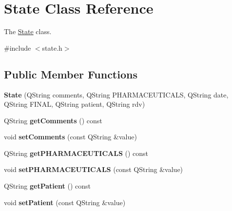 \hypertarget{class_state}{}\section{State Class Reference}
\label{class_state}


The \mbox{\hyperlink{class_state}{State}} class.  




{\ttfamily \#include $<$state.\+h$>$}

\subsection*{Public Member Functions}
\begin{DoxyCompactItemize}
\item 
\mbox{\label{class_state_a8ded2cb128d0c4d3dde1fedb066e964a}} 
{\bfseries State} (Q\+String comments, Q\+String P\+H\+A\+R\+M\+A\+C\+E\+U\+T\+I\+C\+A\+LS, Q\+String date, Q\+String F\+I\+N\+AL, Q\+String patient, Q\+String rdv)
\item 
\mbox{\label{class_state_ad92b83c6f4907e456cdfc5b51fa8fdd1}} 
Q\+String {\bfseries get\+Comments} () const
\item 
\mbox{\label{class_state_ac23a5b33d51e2e2798ab5ec94f54d379}} 
void {\bfseries set\+Comments} (const Q\+String \&value)
\item 
\mbox{\label{class_state_a2b63ae87a83465d6f8fae8c2ad109c15}} 
Q\+String {\bfseries get\+P\+H\+A\+R\+M\+A\+C\+E\+U\+T\+I\+C\+A\+LS} () const
\item 
\mbox{\label{class_state_aa494c330e398a6477699b7a3890a6d4f}} 
void {\bfseries set\+P\+H\+A\+R\+M\+A\+C\+E\+U\+T\+I\+C\+A\+LS} (const Q\+String \&value)
\item 
\mbox{\label{class_state_a7743f5db2b54ebf32d8a319b665bccda}} 
Q\+String {\bfseries get\+Patient} () const
\item 
\mbox{\label{class_state_a47652011d60fd6cc7ff03f8623b37773}} 
void {\bfseries set\+Patient} (const Q\+String \&value)
\item 
\mbox{\label{class_state_a76a40e5234b701cadfbc69d72b8a0a04}} 

\end{DoxyCompactItemize}
